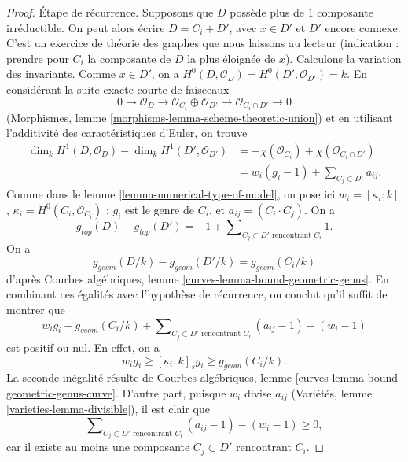 \begin{proof}
\medskip\noindent
Étape de récurrence. Supposons que $D$ possède plus de $1$ composante
irréductible. On peut alors écrire $D = C_i + D'$, avec $x \in D'$ et
$D'$ encore connexe. C'est un exercice de théorie des graphes que nous
laissons au lecteur (indication : prendre pour $C_i$ la composante de $D$
la plus éloignée de $x$). Calculons la variation des invariants.
Comme $x \in D'$, on a
$H^0(D, \mathcal{O}_D) = H^0(D', \mathcal{O}_{D'}) = k$.
En considérant la suite exacte courte de faisceaux
$$
0 \to \mathcal{O}_D \to \mathcal{O}_{C_i} \oplus \mathcal{O}_{D'}
\to \mathcal{O}_{C_i \cap D'} \to 0
$$
(Morphismes, lemme \ref{morphisms-lemma-scheme-theoretic-union}) et en
utilisant l'additivité des caractéristiques d'Euler, on trouve
\begin{align*}
\dim_k H^1(D, \mathcal{O}_D) - \dim_k H^1(D', \mathcal{O}_{D'})
& =
-\chi(\mathcal{O}_{C_i}) + \chi(\mathcal{O}_{C_i \cap D'}) \\
& =
w_i(g_i - 1) + \sum\nolimits_{C_j \subset D'} a_{ij}.
\end{align*}
Comme dans le lemme \ref{lemma-numerical-type-of-model}, on pose ici
$w_i = [\kappa_i : k]$, $\kappa_i = H^0(C_i, \mathcal{O}_{C_i})$ ;
$g_i$ est le genre de $C_i$, et $a_{ij} = (C_i \cdot C_j)$.
On a
$$
g_{top}(D) - g_{top}(D') = -1 +
\sum\nolimits_{C_j \subset D'\text{ rencontrant }C_i} 1.
$$
On a
$$
g_{geom}(D/k) - g_{geom}(D'/k) = g_{geom}(C_i/k)
$$
d'après Courbes algébriques, lemme
\ref{curves-lemma-bound-geometric-genus}. En combinant ces égalités avec
l'hypothèse de récurrence, on conclut qu'il suffit de montrer que
$$
w_i g_i - g_{geom}(C_i/k) +
\sum\nolimits_{C_j \subset D'\text{ rencontrant } C_i} (a_{ij} - 1) - (w_i - 1)
$$
est positif ou nul. En effet, on a
\begin{equation}
\label{equation-genus-change}
w_i g_i \geq [\kappa_i : k]_s g_i \geq g_{geom}(C_i/k).
\end{equation}
La seconde inégalité résulte de Courbes algébriques, lemme
\ref{curves-lemma-bound-geometric-genus-curve}. D'autre part, puisque
$w_i$ divise $a_{ij}$ (Variétés, lemme
\ref{varieties-lemma-divisible}), il est clair que
\begin{equation}
\label{equation-change-intersections}
\sum\nolimits_{C_j \subset D'\text{ rencontrant } C_i} (a_{ij} - 1) - (w_i - 1)
\geq 0,
\end{equation}
car il existe au moins une composante $C_j \subset D'$ rencontrant $C_i$.
\end{proof}

